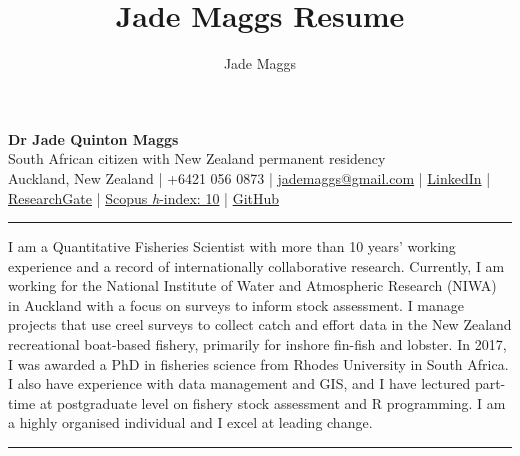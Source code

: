 \documentclass[10pt,a4paper]{article}
\author{Jade Maggs}
\title{Jade Maggs Resume}
\begin{document}
	
\noindent
{\Large \textbf{Dr Jade Quinton Maggs}}\\
South African citizen with New Zealand permanent residency\\
{\small Auckland, New Zealand | +6421 056 0873 | \href{mailto:jademaggs@gmail.com}{jademaggs@gmail.com} |
\href{http://www.linkedin.com/pub/jade-maggs/29/917/5a0}{LinkedIn} |
			\href{https://www.researchgate.net/profile/Jade_Maggs}{ResearchGate} | 
			\href{https://www.scopus.com/authid/detail.uri?authorId=55250227800}{Scopus \textit{h}-index: 10} |
			\href{https://github.com/jademaggs?tab=repositories}{GitHub}}\\
\hrule
\vspace{6pt}
\noindent
I am a Quantitative Fisheries Scientist with more than 10 years' working experience and a record of internationally collaborative research. Currently, I am working for the National Institute of Water and Atmospheric Research (NIWA) in Auckland with a focus on surveys to inform stock assessment. I manage projects that use creel surveys to collect catch and effort data in the New Zealand recreational boat-based fishery, primarily for inshore fin-fish and lobster. In 2017, I was awarded a PhD in fisheries science from Rhodes University in South Africa. I also have experience with data management and GIS, and I have lectured part-time at postgraduate level on fishery stock assessment and R programming. I am a highly organised individual and I excel at leading change. \\
\hrule
\vspace{6pt}
\noindent

\end{document}
